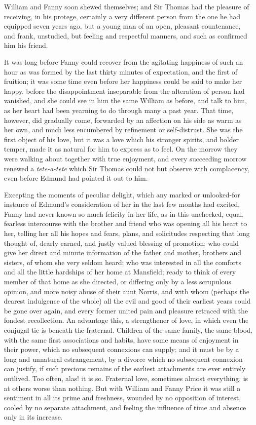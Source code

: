 William and Fanny soon shewed themselves; and Sir Thomas
had the pleasure of receiving, in his protege, certainly a
very different person from the one he had equipped seven
years ago, but a young man of an open, pleasant countenance,
and frank, unstudied, but feeling and respectful manners,
and such as confirmed him his friend.

It was long before Fanny could recover from the agitating
happiness of such an hour as was formed by the last
thirty minutes of expectation, and the first of fruition;
it was some time even before her happiness could be said
to make her happy, before the disappointment inseparable
from the alteration of person had vanished, and she could
see in him the same William as before, and talk to him,
as her heart had been yearning to do through many
a past year.  That time, however, did gradually come,
forwarded by an affection on his side as warm as her own,
and much less encumbered by refinement or self-distrust.
She was the first object of his love, but it was a love
which his stronger spirits, and bolder temper, made it
as natural for him to express as to feel.  On the morrow
they were walking about together with true enjoyment,
and every succeeding morrow renewed a \emph{tete-a-tete}
which Sir Thomas could not but observe with complacency,
even before Edmund had pointed it out to him.

Excepting the moments of peculiar delight, which any marked
or unlooked-for instance of Edmund's consideration of her
in the last few months had excited, Fanny had never known
so much felicity in her life, as in this unchecked, equal,
fearless intercourse with the brother and friend who was opening
all his heart to her, telling her all his hopes and fears,
plans, and solicitudes respecting that long thought of,
dearly earned, and justly valued blessing of promotion;
who could give her direct and minute information of the
father and mother, brothers and sisters, of whom she
very seldom heard; who was interested in all the comforts
and all the little hardships of her home at Mansfield;
ready to think of every member of that home as she directed,
or differing only by a less scrupulous opinion, and more
noisy abuse of their aunt Norris, and with whom (perhaps
the dearest indulgence of the whole) all the evil and
good of their earliest years could be gone over again,
and every former united pain and pleasure retraced
with the fondest recollection.  An advantage this,
a strengthener of love, in which even the conjugal tie
is beneath the fraternal.  Children of the same family,
the same blood, with the same first associations and habits,
have some means of enjoyment in their power, which no
subsequent connexions can supply; and it must be by a
long and unnatural estrangement, by a divorce which no
subsequent connexion can justify, if such precious remains
of the earliest attachments are ever entirely outlived.
Too often, alas! it is so.  Fraternal love, sometimes
almost everything, is at others worse than nothing.
But with William and Fanny Price it was still a sentiment
in all its prime and freshness, wounded by no opposition
of interest, cooled by no separate attachment, and feeling
the influence of time and absence only in its increase.

